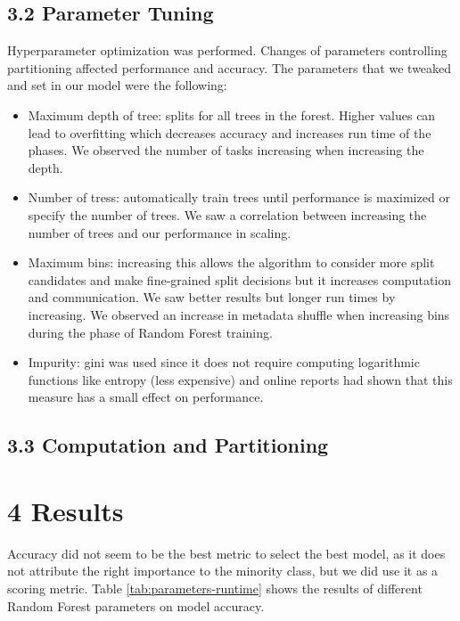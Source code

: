 \documentclass{neu_handout}
\begin{document}
\subsection*{3.2 Parameter Tuning}

Hyperparameter optimization was performed. Changes of parameters controlling partitioning affected performance and accuracy. The parameters that we tweaked and set in our model were the following:

\begin{itemize}
\setlength\itemsep{0.2em}
\item Maximum depth of tree: splits for all trees in the forest. Higher values can lead to overfitting which decreases accuracy and increases run time of the phases. We observed the number of tasks increasing when increasing the depth.
\item Number of tress: automatically train trees until performance is maximized or specify the number of trees. We saw a correlation between increasing the number of trees and our performance in scaling.
\item Maximum bins: increasing this allows the algorithm to consider more split candidates and make fine-grained split decisions but it increases computation and communication. We saw better results but longer run times by increasing. We observed an increase in metadata shuffle when increasing bins during the phase of Random Forest training.
\item Impurity: gini was used since it does not require computing logarithmic functions like entropy (less expensive) and online reports had shown that this measure has a small effect on performance.
\end{itemize}

\subsection*{3.3 Computation and Partitioning}


\section*{4 Results}

Accuracy did not seem to be the best metric to select the best model, as it does not attribute the right importance to the minority class, but we did use it as a scoring metric. Table \ref{tab:parameters-runtime} shows the results of different Random Forest parameters on model accuracy.
\end{document}
